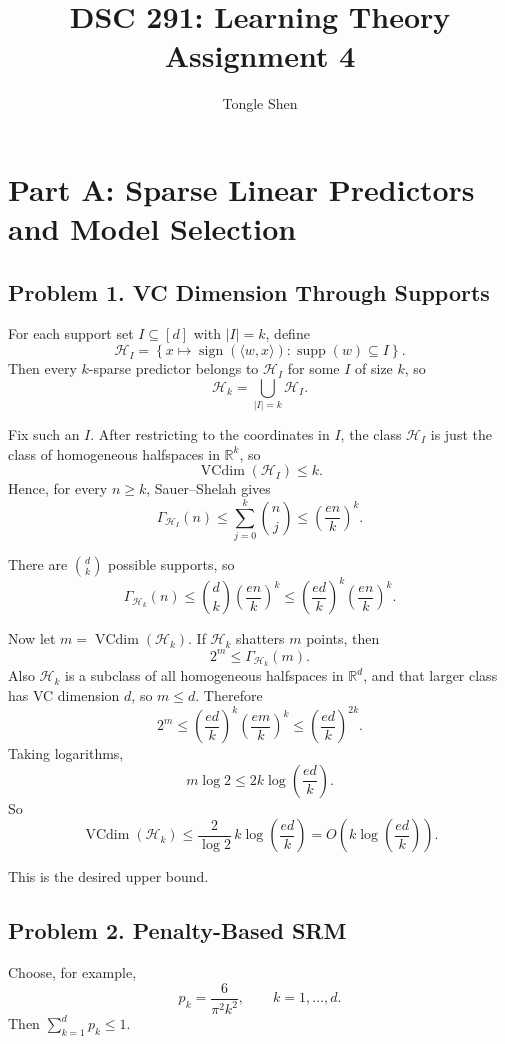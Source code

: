 \documentclass{article}
\title{DSC 291: Learning Theory Assignment 4}
\author{Tongle Shen}
\DeclareMathOperator{\VC}{VCdim}
\DeclareMathOperator{\supp}{supp}
\DeclareMathOperator{\sign}{sign}
\newcommand{\cH}{\mathcal{H}}
\begin{document}
\maketitle

\section{Part A: Sparse Linear Predictors and Model Selection}

\subsection{Problem 1. VC Dimension Through Supports}

For each support set $I \subseteq [d]$ with $|I|=k$, define
$$
\cH_I
=
\left\{
x \mapsto \sign(\langle w,x\rangle)
:
\supp(w)\subseteq I
\right\}.
$$
Then every $k$-sparse predictor belongs to $\cH_I$ for some $I$ of size $k$, so
$$
\cH_k = \bigcup_{|I|=k} \cH_I.
$$

Fix such an $I$. After restricting to the coordinates in $I$, the class $\cH_I$ is just the class of homogeneous halfspaces in $\mathbb{R}^k$, so
$$
\VC(\cH_I) \le k.
$$
Hence, for every $n\ge k$, Sauer--Shelah gives
$$
\Gamma_{\cH_I}(n)
\le
\sum_{j=0}^k \binom{n}{j}
\le
\left(\frac{en}{k}\right)^k.
$$

There are $\binom{d}{k}$ possible supports, so
$$
\Gamma_{\cH_k}(n)
\le
\binom{d}{k}\left(\frac{en}{k}\right)^k
\le
\left(\frac{ed}{k}\right)^k \left(\frac{en}{k}\right)^k.
$$

Now let $m=\VC(\cH_k)$. If $\cH_k$ shatters $m$ points, then
$$
2^m \le \Gamma_{\cH_k}(m).
$$
Also $\cH_k$ is a subclass of all homogeneous halfspaces in $\mathbb{R}^d$, and that larger class has VC dimension $d$, so $m\le d$. Therefore
$$
2^m
\le
\left(\frac{ed}{k}\right)^k \left(\frac{em}{k}\right)^k
\le
\left(\frac{ed}{k}\right)^{2k}.
$$
Taking logarithms,
$$
m\log 2 \le 2k \log\!\left(\frac{ed}{k}\right).
$$
So
$$
\VC(\cH_k)
\le
\frac{2}{\log 2}\,k\log\!\left(\frac{ed}{k}\right)
=
O\!\left(k\log\!\left(\frac{ed}{k}\right)\right).
$$

This is the desired upper bound.

\subsection{Problem 2. Penalty-Based SRM}

Choose, for example,
$$
p_k = \frac{6}{\pi^2 k^2},
\qquad
k=1,\dots,d.
$$
Then $\sum_{k=1}^d p_k \le 1$.
\end{document}
